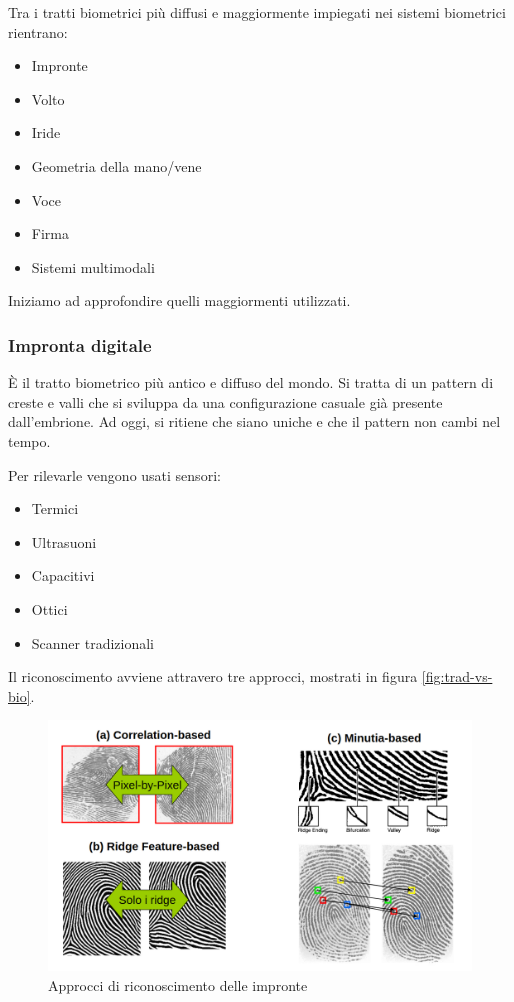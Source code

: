 Tra i tratti biometrici più diffusi e maggiormente impiegati nei sistemi biometrici rientrano:
\begin{itemize}
    \item Impronte
    \item Volto
    \item Iride
    \item Geometria della mano/vene
    \item Voce
    \item Firma
    \item Sistemi multimodali
\end{itemize}
Iniziamo ad approfondire quelli maggiormenti utilizzati.

\subsubsection{Impronta digitale}
È il tratto biometrico più antico e diffuso del mondo. Si tratta di un pattern di creste e valli che si sviluppa da una configurazione casuale già presente dall'embrione. Ad oggi, si ritiene che siano uniche e che il pattern non cambi nel tempo.

Per rilevarle vengono usati sensori:
\begin{itemize}
    \item Termici
    \item Ultrasuoni
    \item Capacitivi
    \item Ottici
    \item Scanner tradizionali
\end{itemize}

Il riconoscimento avviene attravero tre approcci, mostrati in figura \ref{fig:trad-vs-bio}.

\begin{figure}
    \centering
    \includegraphics[width=1\linewidth]{chapters/images-chap1/impronte.png}
    \caption{Approcci di riconoscimento delle impronte}
    \label{fig:impronte}
\end{figure}

